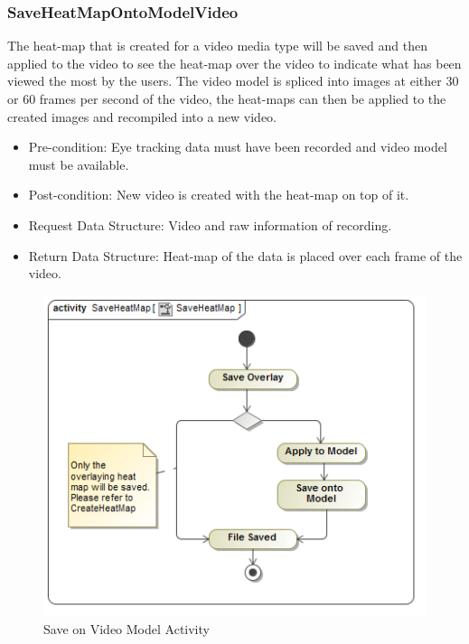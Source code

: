 	\subsubsection{SaveHeatMapOntoModelVideo}
	The heat-map that is created for a video media type will be saved and then applied to the video to see the heat-map over the video to indicate what has been viewed the most by the users. The video model is spliced into images at either 30 or 60 frames per second of the video, the heat-maps can then be applied to the created images and recompiled into a new video.
	\begin{itemize}
		\item Pre-condition: Eye tracking data must have been recorded and video model must be available.
		\item Post-condition: New video is created with the heat-map on top of it.
		\item Request Data Structure: Video and raw information of recording.
		\item Return Data Structure: Heat-map of the data is placed over each frame of the video.
	\end{itemize}
	\begin{figure}[!ht]
		\centering	
		\includegraphics[scale=0.5]{Diagrams/Activity_Diagram__SaveHeatMap__SaveHeatMap.png}	
		\caption{Save on Video Model Activity}
	\end{figure}

